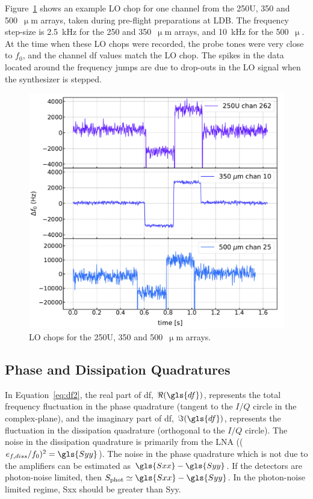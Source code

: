 Figure~\ref{fig:lo chops} shows an example LO chop for one channel from the 250U, 350 and 500~$\upmu$m arrays, taken during pre-flight preparations at LDB. The frequency step-size is 2.5~kHz for the 250 and 350~$\upmu$m arrays, and 10~kHz for the 500~$\upmu$. At the time when these LO chops were recorded, the probe tones were very close to $f_{0}$, and the channel \gls{df} values match the LO chop. The spikes in the data located around the frequency jumps are due to drop-outs in the LO signal when the synthesizer is stepped.

\begin{figure}[!htbp]
\centering
\includegraphics[width=\textwidth]{figures/blast_data/timestreams/ice_lo_chops}
\caption[~LO chops for the 250U, 350 and 500~ arrays.]{LO chops for the 250U, 350 and 500~$\upmu$m arrays.}
\label{fig:lo chops}
\end{figure}

\subsection{Phase and Dissipation Quadratures}

In Equation~\ref{eq:df2}, the real part of \gls{df}, $\Re(\gls{df})$, represents the total frequency fluctuation in the phase quadrature (tangent to the $I/Q$ circle in the complex-plane), and the imaginary part of \gls{df}, $\Im(\gls{df})$, represents the fluctuation in the dissipation quadrature (orthogonal to the $I/Q$ circle). The noise in the dissipation quadrature is primarily from the LNA (($e_{f,diss}/f_{0})^{2} = \gls{Syy}$). The noise in the phase quadrature which is not due to the amplifiers can be estimated as $\gls{Sxx} - \gls{Syy}$. If the detectors are photon-noise limited, then $S_{\mathrm{phot}} \simeq \gls{Sxx} - \gls{Syy}$. In the photon-noise limited regime, \gls{Sxx} should be greater than \gls{Syy}.

